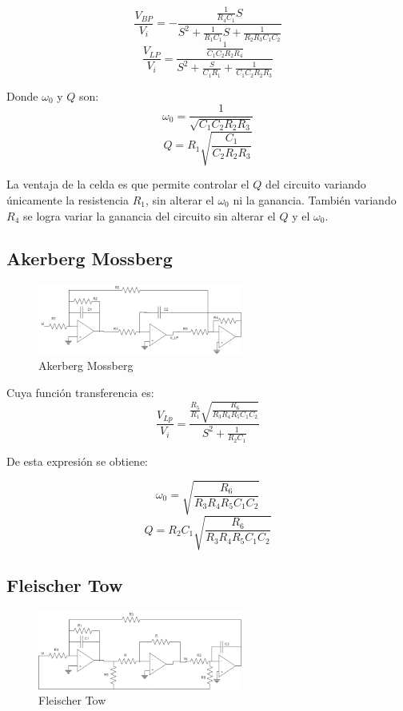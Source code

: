 \documentclass[../../tc_tp5_main.tex]{subfiles}
\begin{document}
$$\frac{V_{BP}}{V_i}=-\frac{\frac{1}{R_4 C_1}S}{S^2 +\frac{1}{R_1 C_1}S+\frac{1}{R_2 R_3 C_1 C_2}}$$
$$\frac{V_{LP}}{V_i}=\frac{\frac{1}{C_1 C_2 R_2 R_4}}{S^2 + \frac{S}{C_1 R_1}+ \frac{1}{C_1 C_2 R_2 R_3}} $$

Donde $\omega_0$ y $Q$ son:
$$ \omega_0=\frac{1}{\sqrt{C_1 C_2 R_2 R_3}} $$
$$ Q= R_1 \sqrt{\frac{C_1}{C_2 R_2 R_3}}$$
 
La ventaja de la celda es que permite controlar el $Q$ del circuito variando únicamente la resistencia $R_1$, sin alterar el $\omega_0$ ni la ganancia. También variando $R_4$ se logra variar la ganancia del circuito sin alterar el $Q$ y el $\omega_0$.

\subsection{Akerberg Mossberg}

\begin{figure}[H]	
	\centering
	\includegraphics[width=0.6\textwidth]{imagenes/am.png}
	\caption{Akerberg Mossberg}
\end{figure}

Cuya función transferencia es:
$$\frac{V_{Lp}}{V_i}=\frac{\frac{R_5}{R_1}\sqrt{\frac{R_6}{R_3 R_4 R_5 C_1 C_2}}}{S^2 + \frac{1}{R_2 C_1}} $$

De esta expresión se obtiene:

$$\omega_0=\sqrt{\frac{R_6}{R_3 R_4 R_5 C_1 C_2}} $$
$$Q=R_2 C_1 \sqrt{\frac{R_6}{R_3 R_4 R_5 C_1 C_2}}  $$


\subsection{Fleischer Tow}

\begin{figure}[H]	
	\centering
	\includegraphics[width=0.6\textwidth]{imagenes/ft.png}
	\caption{Fleischer Tow}
\end{figure}
 
\end{document}

